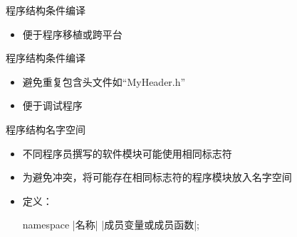 \begin{frame}[fragile]{程序结构}{条件编译}
  \begin{itemize}
  \item 便于程序移植或跨平台
  \end{itemize}
  \begin{center}
    \begin{minipage}{0.4\linewidth}
    \end{minipage}\qquad
    \begin{minipage}{0.4\linewidth}
    \end{minipage}
  \end{center}
\end{frame}

\begin{frame}[fragile]{程序结构}{条件编译}
  \begin{itemize}
  \item 避免重复包含头文件如``MyHeader.h''\\
    \begin{center}
      \begin{minipage}{0.4\linewidth}
      \end{minipage}
    \end{center}
  \item 便于调试程序\\
    \begin{center}
      \begin{minipage}{0.4\linewidth}
      \end{minipage}
    \end{center}
  \end{itemize}
\end{frame}

\begin{frame}[fragile]{程序结构}{名字空间}
  \stretchon
  \begin{itemize}
  \item 不同程序员撰写的软件模块可能使用相同标志符
  \item 为避免冲突，将可能存在相同标志符的程序模块放入名字空间
  \item 定义：\\
    \begin{minipage}{0.8\linewidth}
      \begin{cpptt}
namespace |名称|
{
   |成员变量或成员函数|;
}
        \end{cpptt}
      \end{minipage}
    \end{itemize}
    \stretchoff
\end{frame}

